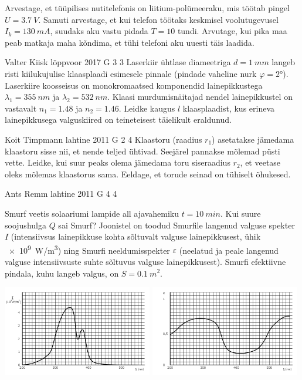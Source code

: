 \documentclass[11pt, twoside]{article}
\begin{document}
{{Arvestage, et tüüpilises nutitelefonis on liitium-polümeeraku, mis töötab pingel $U=\SI{3.7}{V}$. Samuti arvestage, et kui telefon töötaks keskmisel voolutugevusel $I_k=\SI{130}{mA}$, suudaks aku vastu pidada $T=10$ tundi. Arvutage, kui pika maa peab matkaja maha kõndima, et tühi telefoni aku uuesti täis laadida.
\fi
}

{Valter Kiisk} %
{lõppvoor} %
{2017} %
{G 3} %
{3} %
{
\ifStatement
Laserkiir ühtlase diameetriga $d=\SI{1}{mm}$ langeb risti kiilukujulise klaasplaadi esimesele pinnale (pindade vaheline nurk $\varphi=\ang{2}$). Laserkiire koosseisus on monokromaatsed komponendid lainepikkustega $\lambda_1=\SI{355}{nm}$ ja $\lambda_2=\SI{532}{nm}$. Klaasi murdumisnäitajad nendel lainepikkustel on vastavalt $n_1=\num{1.48}$ ja $n_2=\num{1.46}$. Leidke kaugus $l$ klaasplaadist, kus erineva lainepikkusega valguskiired on teineteisest täielikult eraldunud.
\fi
}

{Koit Timpmann} %
{lahtine} %
{2011} %
{G 2} %
{4} %
{
\ifStatement
Klaastoru (raadius $r_1$) asetatakse jämedama klaastoru sisse nii, et nende teljed ühtivad. Seejärel
pannakse mõlemad püsti vette. Leidke, kui suur peaks olema jämedama toru
siseraadius $r_2$, et veetase oleks mõlemas klaastorus sama. Eeldage, et torude
seinad on tühiselt õhukesed.
\fi
}

{Ants Remm} %
{lahtine} %
{2011} %
{G 4} %
{4} %
{
\ifStatement
Smurf veetis solaariumi lampide all ajavahemiku $t = \SI{10}{min} $. Kui suure soojushulga $ Q $
sai Smurf? Joonistel on toodud Smurfile langenud valguse spekter $I$
(intensiivsus lainepikkuse kohta sõltuvalt valguse lainepikkusest, ühik
\SI{e9}{W/m^3}) ning Smurfi	
neeldumisspekter $\varepsilon$ (neelatud ja peale langenud valguse
intensiivsuste suhte
sõltuvus valguse lainepikkusest).
Smurfi efektiivne pindala, kuhu langeb valgus, on $ S = \SI{0,1}{m^2} $.
\begin{center}
\includegraphics[width=0.49\textwidth]{2011-lahg-04-I}
\includegraphics[width=0.49\textwidth]{2011-lahg-04-epsilon}
\end{center}
\fi
}

}
\end{document}
